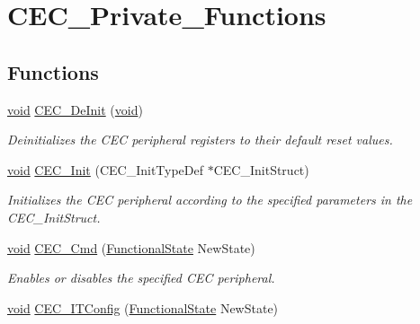 \hypertarget{group___c_e_c___private___functions}{\section{C\-E\-C\-\_\-\-Private\-\_\-\-Functions}
\label{group___c_e_c___private___functions}
}
\subsection*{Functions}
\begin{DoxyCompactItemize}
\item 
\hyperlink{group___n_a_m_e_ga18028b8badbf1ea7e704ccac3c488e82}{void} \hyperlink{group___c_e_c___private___functions_ga604c3b15b51a46303c201fa3deac2212}{C\-E\-C\-\_\-\-De\-Init} (\hyperlink{group___n_a_m_e_ga18028b8badbf1ea7e704ccac3c488e82}{void})
\begin{DoxyCompactList}\small\item\em Deinitializes the C\-E\-C peripheral registers to their default reset values. \end{DoxyCompactList}\item 
\hyperlink{group___n_a_m_e_ga18028b8badbf1ea7e704ccac3c488e82}{void} \hyperlink{group___c_e_c___private___functions_gaf48aee745a16370372b3eaa7cf3ed22b}{C\-E\-C\-\_\-\-Init} (C\-E\-C\-\_\-\-Init\-Type\-Def $\ast$C\-E\-C\-\_\-\-Init\-Struct)
\begin{DoxyCompactList}\small\item\em Initializes the C\-E\-C peripheral according to the specified parameters in the C\-E\-C\-\_\-\-Init\-Struct. \end{DoxyCompactList}\item 
\hyperlink{group___n_a_m_e_ga18028b8badbf1ea7e704ccac3c488e82}{void} \hyperlink{group___c_e_c___private___functions_ga0c8efa79e5768930e567b3b3ed6e09e9}{C\-E\-C\-\_\-\-Cmd} (\hyperlink{group___exported__types_gac9a7e9a35d2513ec15c3b537aaa4fba1}{Functional\-State} New\-State)
\begin{DoxyCompactList}\small\item\em Enables or disables the specified C\-E\-C peripheral. \end{DoxyCompactList}\item 
\hyperlink{group___n_a_m_e_ga18028b8badbf1ea7e704ccac3c488e82}{void} \hyperlink{group___c_e_c___private___functions_ga8be87c514505cf82eb29334f054fc0bc}{C\-E\-C\-\_\-\-I\-T\-Config} (\hyperlink{group___exported__types_gac9a7e9a35d2513ec15c3b537aaa4fba1}{Functional\-State} New\-State)

\end{DoxyCompactItemize}
